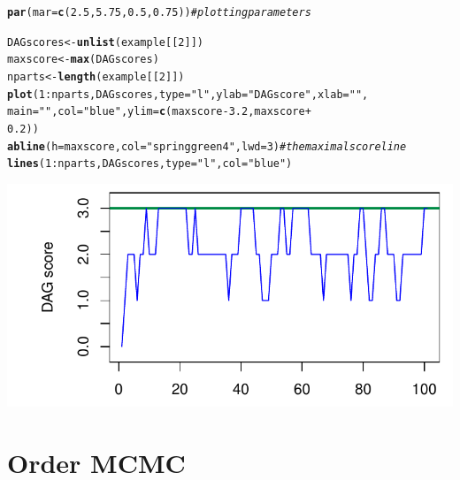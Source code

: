 \documentclass[a4paper]{article}\usepackage[]{graphicx}\usepackage[]{color}
\makeatletter
\def\maxwidth{ %
  \ifdim\Gin@nat@width>\linewidth
    \linewidth
  \else
    \Gin@nat@width
  \fi
}
\newcommand{\hlnum}[1]{\textcolor[rgb]{0.686,0.059,0.569}{#1}}%
\newcommand{\hlstr}[1]{\textcolor[rgb]{0.192,0.494,0.8}{#1}}%
\newcommand{\hlcom}[1]{\textcolor[rgb]{0.678,0.584,0.686}{\textit{#1}}}%
\newcommand{\hlopt}[1]{\textcolor[rgb]{0,0,0}{#1}}%
\newcommand{\hlstd}[1]{\textcolor[rgb]{0.345,0.345,0.345}{#1}}%
\newcommand{\hlkwb}[1]{\textcolor[rgb]{0.69,0.353,0.396}{#1}}%
\newcommand{\hlkwc}[1]{\textcolor[rgb]{0.333,0.667,0.333}{#1}}%
\newcommand{\hlkwd}[1]{\textcolor[rgb]{0.737,0.353,0.396}{\textbf{#1}}}%
\newenvironment{kframe}{%
 \def\at@end@of@kframe{}%
 \ifinner\ifhmode%
  \def\at@end@of@kframe{\end{minipage}}%
  \begin{minipage}{\columnwidth}%
 \fi\fi%
 \def\FrameCommand##1{\hskip\@totalleftmargin \hskip-\fboxsep
 \colorbox{shadecolor}{##1}\hskip-\fboxsep
     \hskip-\linewidth \hskip-\@totalleftmargin \hskip\columnwidth}%
 \MakeFramed {\advance\hsize-\width
   \@totalleftmargin\z@ \linewidth\hsize
   \@setminipage}}%
 {\par\unskip\endMakeFramed%
 \at@end@of@kframe}
\newenvironment{knitrout}{}{} %
\makeatother
\begin{document}
\begin{knitrout}
\color{fgcolor}\begin{kframe}
\begin{alltt}
\hlkwd{par}\hlstd{(}\hlkwc{mar} \hlstd{=} \hlkwd{c}\hlstd{(}\hlnum{2.5}\hlstd{,} \hlnum{5.75}\hlstd{,} \hlnum{0.5}\hlstd{,} \hlnum{0.75}\hlstd{))}  \hlcom{# plotting parameters}

\hlstd{DAGscores} \hlkwb{<-} \hlkwd{unlist}\hlstd{(example[[}\hlnum{2}\hlstd{]])}
\hlstd{maxscore} \hlkwb{<-} \hlkwd{max}\hlstd{(DAGscores)}
\hlstd{nparts} \hlkwb{<-} \hlkwd{length}\hlstd{(example[[}\hlnum{2}\hlstd{]])}
\hlkwd{plot}\hlstd{(}\hlnum{1}\hlopt{:}\hlstd{nparts, DAGscores,} \hlkwc{type} \hlstd{=} \hlstr{"l"}\hlstd{,} \hlkwc{ylab} \hlstd{=} \hlstr{"DAG score"}\hlstd{,} \hlkwc{xlab} \hlstd{=} \hlstr{""}\hlstd{,}
    \hlkwc{main} \hlstd{=} \hlstr{""}\hlstd{,} \hlkwc{col} \hlstd{=} \hlstr{"blue"}\hlstd{,} \hlkwc{ylim} \hlstd{=} \hlkwd{c}\hlstd{(maxscore} \hlopt{-} \hlnum{3.2}\hlstd{, maxscore} \hlopt{+}
        \hlnum{0.2}\hlstd{))}
\hlkwd{abline}\hlstd{(}\hlkwc{h} \hlstd{= maxscore,} \hlkwc{col} \hlstd{=} \hlstr{"springgreen4"}\hlstd{,} \hlkwc{lwd} \hlstd{=} \hlnum{3}\hlstd{)}  \hlcom{# the maximal score line}
\hlkwd{lines}\hlstd{(}\hlnum{1}\hlopt{:}\hlstd{nparts, DAGscores,} \hlkwc{type} \hlstd{=} \hlstr{"l"}\hlstd{,} \hlkwc{col} \hlstd{=} \hlstr{"blue"}\hlstd{)}
\end{alltt}
\end{kframe}

{\centering \includegraphics[width=\maxwidth]{figure/minimal-unnamed-chunk-13-1} 

}



\end{knitrout}

\section{Order MCMC}
\end{document}
